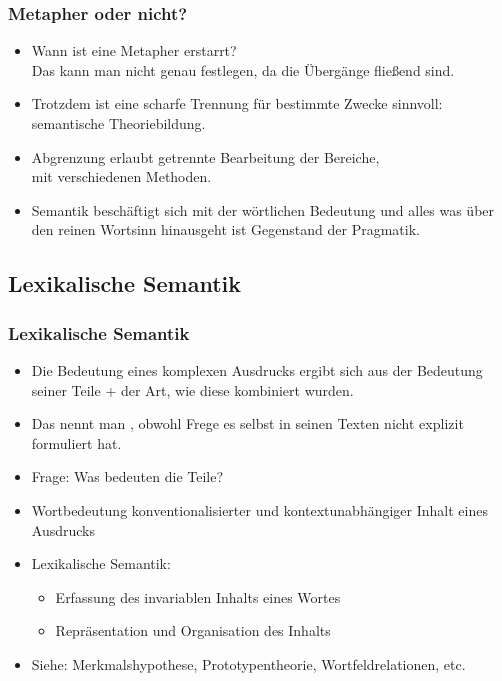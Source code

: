 \begin{frame}
\frametitle{Metapher oder nicht?}
  \begin{itemize}
  \item Wann ist eine Metapher erstarrt?\\
        Das kann man nicht genau festlegen, da die Übergänge fließend sind.
\pause
\item Trotzdem ist eine scharfe Trennung für bestimmte Zwecke sinnvoll:\\ semantische Theoriebildung.
\pause
\item Abgrenzung erlaubt getrennte Bearbeitung der Bereiche,\\ mit verschiedenen Methoden.
\pause
\item Semantik beschäftigt sich mit der wörtlichen Bedeutung und alles was über den reinen Wortsinn
  hinausgeht ist Gegenstand der Pragmatik.
  \end{itemize}
\end{frame}

\subsection{Lexikalische Semantik}

\begin{frame}
\frametitle{Lexikalische Semantik}

  \begin{itemize}
  \item Die Bedeutung eines komplexen Ausdrucks ergibt sich aus der Bedeutung seiner Teile + der
    Art, wie diese kombiniert wurden.

\pause

\item Das nennt man , obwohl Frege es selbst in seinen Texten nicht explizit
  formuliert hat.

\pause
  \item Frage: Was bedeuten die Teile?

    \bigskip
    
    \pause
    	\item Wortbedeutung \ras konventionalisierter und kontextunabhängiger Inhalt eines Ausdrucks
\pause
	\item Lexikalische Semantik:
	
	\begin{itemize}
		\item Erfassung des invariablen Inhalts eines Wortes
		\item Repräsentation und Organisation des Inhalts
	\end{itemize}
	
\pause
	\item Siehe: Merkmalshypothese, Prototypentheorie, Wortfeldrelationen, etc.


  \end{itemize}
\end{frame}


